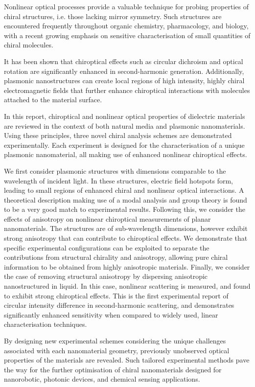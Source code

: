 Nonlinear optical processes provide a valuable technique for probing properties of chiral structures, i.e. those lacking mirror symmetry. 
Such structures are encountered frequently throughout organic chemistry, pharmacology, and biology, with a recent growing emphasis on sensitive characterisation of small quantities of chiral molecules. 
	    
It has been shown that chiroptical effects such as circular dichroism and optical rotation are significantly enhanced in second-harmonic generation. 
Additionally, plasmonic nanostructures can create local regions of high intensity, highly chiral electromagnetic fields that further enhance chiroptical interactions with molecules attached to the material surface. 
	    
In this report, chiroptical and nonlinear optical properties of dielectric materials are reviewed in the context of both natural media and plasmonic nanomaterials. 
Using these principles, three novel chiral analysis schemes are demonstrated experimentally. Each experiment is designed for the characterisation of a unique plasmonic nanomaterial, all making use of enhanced nonlinear chiroptical effects. 

We first consider plasmonic structures with dimensions comparable to the wavelength of incident light. In these structures, electric field hotspots form, leading to small regions of enhanced chiral and nonlinear optical interactions. A theoretical description making use of a modal analysis and group theory is found to be a very good match to experimental results. Following this, we consider the effects of anisotropy on nonlinear chiroptical measurements of planar nanomaterials. The structures are of sub-wavelength dimensions, however exhibit strong anisotropy that can contribute to chiroptical effects. We demonstrate that specific experimental configurations can be exploited to separate the contributions from structural chirality and anisotropy, allowing pure chiral information to be obtained from highly anisotropic materials. Finally, we consider the case of removing structural anisotropy by dispersing anisotropic nanostructured in liquid. In this case, nonlinear scattering is measured, and found to exhibit strong chiroptical effects. This is the first experimental report of circular intensity difference in second-harmonic scattering, and demonstrates significantly enhanced sensitivity when compared to widely used, linear characterisation techniques.

By designing new experimental schemes considering the unique challenges associated with each nanomaterial geometry, previously unobserved optical properties of the materials are revealed. Such tailored experimental methods pave the way for the further optimisation of chiral nanomaterials designed for nanorobotic, photonic devices, and chemical sensing applications.